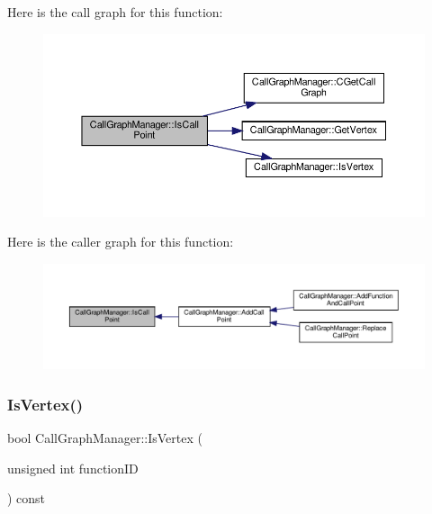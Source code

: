 Here is the call graph for this function\+:
\nopagebreak
\begin{figure}[H]
\begin{center}
\leavevmode
\includegraphics[width=350pt]{d5/d96/classCallGraphManager_a3b5428b1a496b3533bc41d9d419c5688_cgraph}
\end{center}
\end{figure}
Here is the caller graph for this function\+:
\nopagebreak
\begin{figure}[H]
\begin{center}
\leavevmode
\includegraphics[width=350pt]{d5/d96/classCallGraphManager_a3b5428b1a496b3533bc41d9d419c5688_icgraph}
\end{center}
\end{figure}
\mbox{\label{classCallGraphManager_af8ff924d2289789505467f6641620f9e}} 
\subsubsection{\texorpdfstring{Is\+Vertex()}{IsVertex()}}
{\footnotesize\ttfamily bool Call\+Graph\+Manager\+::\+Is\+Vertex (\begin{DoxyParamCaption}\item[{unsigned int}]{function\+ID }\end{DoxyParamCaption}) const}



